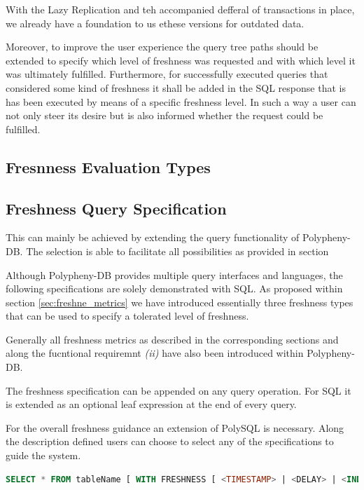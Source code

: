 With the Lazy Replication and teh accompanied defferal of transactions in place, we already have a foundation to us ethese versions
for outdated data.

Moreover, to improve the user experience the query tree paths should be extended to specify which level of freshness was requested and with which level it was 
ultimately fulfilled. Furthermore, for successfully executed queries that considered some kind of freshness it shall be added in the SQL response that is has been 
executed by means of a specific freshness level.
In such a way a user can not only steer its desire but is also informed whether the request could be fulfilled.


\subsection{Fresnness Evaluation Types}



\subsection{Freshness Query Specification}

This can mainly be achieved by extending the query functionality of Polypheny-DB.
The selection is able to facilitate all possibilities as provided in section 

Although Polypheny-DB provides multiple query interfaces and languages, the following specifications are solely demonstrated with SQL. 
As proposed within section \ref{sec:freshne_metrics} we have introduced essentially three freshness types that can be used to specify a tolerated level of freshness.

Generally all freshness metrics as described in the corresponding sections and along the fucntional requiremnt \textit{(ii)} have also been introduced within Polypheny-DB.

The freshness specification can be appended on any query operation.
For SQL it is extended as an optional leaf expression at the end of every query. 

For the overall freshness guidance an extension of PolySQL is necessary.
Along the description defined users can choose to select any of the specifications to guide the system.
\begin{lstlisting}[language=sql, caption={Generalized Freshness Specification}]
SELECT * FROM tableName [ WITH FRESHNESS [ <TIMESTAMP> | <DELAY> | <INDEX> ] ];
\end{lstlisting}

